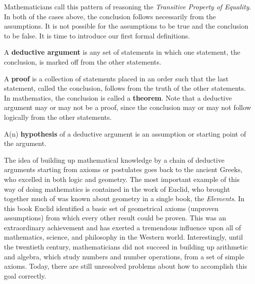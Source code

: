 Mathematicians call this pattern of reasoning the \emph{Transitive Property of Equality}.
In both of the cases above, the conclusion follows necessarily from the assumptions.  It is not possible for the assumptions to be true and the conclusion to be false.  It is time to introduce our first formal definitions.
\begin{dfn}
A \textbf{deductive argument} is any set of statements in which one statement, the conclusion, is marked off from the other statements.
\end{dfn}
\begin{dfn}
A \textbf{proof} is a collection of statements placed in an order such that the last statement, called the conclusion, follows from the truth of the other statements.  In mathematics, the conclusion is called a \textbf{theorem}.   Note that a deductive argument may or may not be a proof, since the conclusion may or may not follow logically from the other statements.
\end{dfn}
\begin{dfn}
A(n) \textbf{hypothesis} of  a deductive argument is an assumption or starting point of the argument.
\end{dfn}

The idea of building up mathematical knowledge by a chain of deductive arguments starting from axioms or postulates goes back to the ancient Greeks, who excelled in both logic and geometry.  The most important example of this way of doing mathematics is contained in the work of  Euclid, who brought together much of was known about geometry in a single book, the \emph{Elements}.  In this book Euclid identified a basic set of geometrical axioms (unproven assumptions)  from which every other result could be proven.  This was an extraordinary achievement and has exerted a tremendous influence upon all of mathematics, science, and philosophy in the Western world.  Interestingly, until the twentieth century, mathematicians did not succeed in building up arithmetic and algebra, which study numbers and number operations, from a set of simple axioms.  Today, there are still unresolved problems about how to accomplish this goal correctly.


